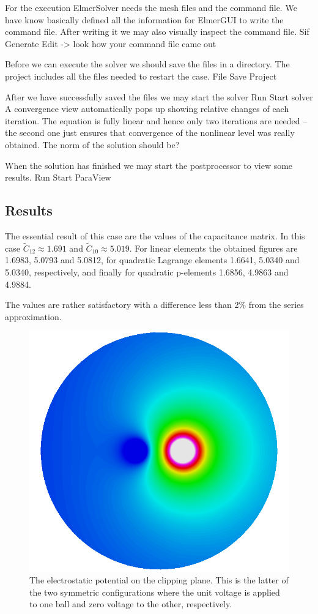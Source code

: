 For the execution 
ElmerSolver needs the mesh files and the command file. We have know basically defined
all the information for ElmerGUI to write the command file. After writing it we may also visually 
inspect the command file.
\ttbegin
Sif 
  Generate
  Edit -> look how your command file came out  
\ttend

Before we can execute the solver we should save the files in a directory. The project includes
all the files needed to restart the case.
\ttbegin
File 
  Save Project
\ttend

After we have successfully saved the files we may start the solver
\ttbegin
Run
  Start solver
\ttend
A convergence view automatically pops up showing relative changes of each iteration.
The equation is fully linear and hence only two iterations are needed -- the second 
one just ensures that convergence of the nonlinear level was really obtained. 
The norm of the solution should be?

When the solution has finished we may start the postprocessor to view some results.
\ttbegin
Run
  Start ParaView
\ttend


\subsection*{Results}

The essential result of this case are the values of the capacitance matrix.
In this case $\tilde{C}_{12} \approx 1.691$ and $\tilde{C}_{10} \approx 5.019$.
For linear elements the obtained figures are 1.6983, 5.0793 and 5.0812, 
for quadratic Lagrange elements 1.6641, 5.0340 and 5.0340, respectively, and
finally for quadratic p-elements 1.6856, 4.9863 and 4.9884. 

The values are rather satisfactory with a difference less than 2\% from the series approximation.


\begin{figure}[h]
\centering
\includegraphics[width=120 mm]{ElmerPost_capture2}
\caption{The electrostatic potential on the clipping plane. This is the latter of the two symmetric configurations where the
unit voltage is applied to one ball and zero voltage to the other, respectively.}\label{fg:ballspost}
\end{figure}  

